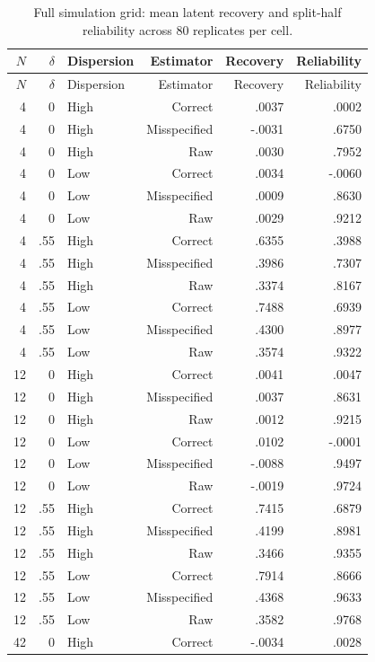 \begingroup
\small
\setlength\LTleft{0pt}
\setlength\LTright{0pt}
\begin{longtable}{rrlrrr}
\caption{Full simulation grid: mean latent recovery and split-half reliability across 80 replicates per cell.}\label{tab:simulation-full}\\
\toprule
$N$ & $\delta$ & Dispersion & Estimator & Recovery & Reliability \\
\midrule
\endfirsthead
\toprule
$N$ & $\delta$ & Dispersion & Estimator & Recovery & Reliability \\
\midrule
\endhead
4 & 0 & High & Correct & .0037 & .0002 \\
4 & 0 & High & Misspecified & -.0031 & .6750 \\
4 & 0 & High & Raw & .0030 & .7952 \\
4 & 0 & Low & Correct & .0034 & -.0060 \\
4 & 0 & Low & Misspecified & .0009 & .8630 \\
4 & 0 & Low & Raw & .0029 & .9212 \\
4 & .55 & High & Correct & .6355 & .3988 \\
4 & .55 & High & Misspecified & .3986 & .7307 \\
4 & .55 & High & Raw & .3374 & .8167 \\
4 & .55 & Low & Correct & .7488 & .6939 \\
4 & .55 & Low & Misspecified & .4300 & .8977 \\
4 & .55 & Low & Raw & .3574 & .9322 \\
12 & 0 & High & Correct & .0041 & .0047 \\
12 & 0 & High & Misspecified & .0037 & .8631 \\
12 & 0 & High & Raw & .0012 & .9215 \\
12 & 0 & Low & Correct & .0102 & -.0001 \\
12 & 0 & Low & Misspecified & -.0088 & .9497 \\
12 & 0 & Low & Raw & -.0019 & .9724 \\
12 & .55 & High & Correct & .7415 & .6879 \\
12 & .55 & High & Misspecified & .4199 & .8981 \\
12 & .55 & High & Raw & .3466 & .9355 \\
12 & .55 & Low & Correct & .7914 & .8666 \\
12 & .55 & Low & Misspecified & .4368 & .9633 \\
12 & .55 & Low & Raw & .3582 & .9768 \\
42 & 0 & High & Correct & -.0034 & .0028 \\

\end{longtable}
